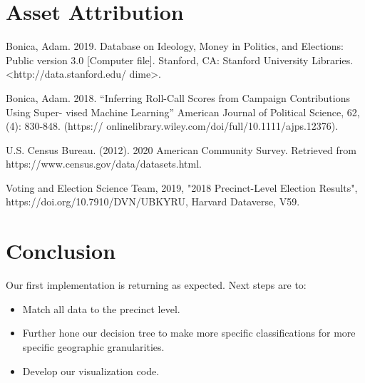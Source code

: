 \documentclass{article}
\begin{document}
\section{Asset Attribution}


Bonica, Adam. 2019. Database on Ideology, Money in Politics, and Elections: Public version
3.0 [Computer file]. Stanford, CA: Stanford University Libraries. <http://data.stanford.edu/
dime>.


Bonica, Adam. 2018. “Inferring Roll-Call Scores from Campaign Contributions Using Super-
vised Machine Learning” American Journal of Political Science, 62, (4): 830-848. (https://
onlinelibrary.wiley.com/doi/full/10.1111/ajps.12376).

U.S. Census Bureau. (2012). 2020 American Community Survey.  
Retrieved from https://www.census.gov/data/datasets.html.

Voting and Election Science Team, 2019, "2018 Precinct-Level Election Results", 
https://doi.org/10.7910/DVN/UBKYRU, Harvard Dataverse, V59.


\section{Conclusion}

Our first implementation is returning as expected. Next steps are to:

\begin{itemize}
\item Match all data to the precinct level.

\item Further hone our decision tree to make more specific classifications
for more specific geographic granularities.

\item Develop our visualization code.
\end{itemize}
\end{document}
